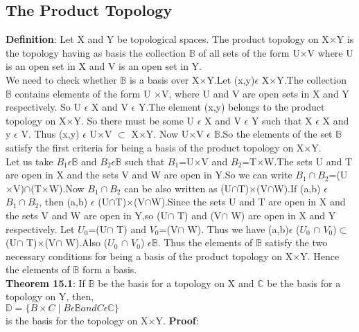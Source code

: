 \documentclass[a4paper,english,12pt]{article}
\begin{document}
\begin{flushleft}
\section{The Product Topology}
{\bf Definition}: Let X and Y be topological spaces. The product topology on X$\times$Y is the topology having as basis the collection $\mathbb{B}$ of all sets of the form U$\times$V where U is an open set in X and V is an open set in Y.\\
\vspace{1mm}
We need to check whether $\mathbb{B}$ is a basis over X$\times$Y.Let (x,y)$\epsilon$ X$\times$Y.The collection $\mathbb{B}$ contains elements of the form U $\times$V, where U and V are open sets in X and Y respectively. So U $\epsilon$ X and V $\epsilon$ Y.The element (x,y) belongs to the product topology on X$\times$Y. So there must be some U $\epsilon$ X and V $\epsilon$ Y such that X $\epsilon$ X and y $\epsilon$ V. Thus (x,y) $\epsilon$ U$\times$V $\subset$ X$\times$Y. Now U$\times$V $\epsilon$ $\mathbb{B}$.So the elements of the set $\mathbb{B}$ satisfy the first criteria for being a basis of the product topology on  X$\times$Y.\\
\vspace{1mm}
Let us take $B{_1}\epsilon\mathbb{B}$ and $B{_2}\epsilon\mathbb{B}$ such that $B{_1}$=U$\times$V and $B{_2}$=T$\times$W.The sets U and T are open in X and the sets V and W are open in Y.So we can write $B{_1}\cap B{_2}$=(U$\times$V)$\cap $(T$\times$W).Now $B{_1}\cap B{_2}$ can be also written as (U$\cap $T)$\times $(V$\cap $W).If (a,b) $\epsilon$ $B{_1}\cap B{_2}$, then (a,b) $\epsilon$ (U$\cap $T)$\times $(V$\cap $W).Since the sets
U and T are open in X and the sets V and W are open in Y,so (U$\cap$ T) and (V$\cap$ W) are open in X and Y respectively. Let $U_0$=(U$\cap$ T) and $V_0$=(V$\cap$ W). Thus we have (a,b)$\epsilon$ ($U_0$ $\cap $ $V_0$)$\subset$ (U$\cap$ T)$\times $(V$\cap$ W).Also ($U_0$ $\cap$ $V_0$) $\epsilon \mathbb{B}$. Thus the elements of $\mathbb{B}$ satisfy the two necessary conditions for being a basis of the product topology on X$\times$Y. Hence the elements of $\mathbb{B}$ form a basis.\\
\vspace{2mm}
{\bf Theorem 15.1}: If $\mathbb{B}$ be the basis for a topology on X and $\mathbb{C}$ be the basis for a topology on Y, then,\\
\vspace{1mm}
$\mathbb{D}=\{B\times C\mid B \epsilon \mathbb{B} and C \epsilon \mathbb{C}\}$\\
\vspace{1mm}
is the basis for the topology on X$\times$Y.
{\bf Proof}: 


\end{flushleft}
\end{document}
